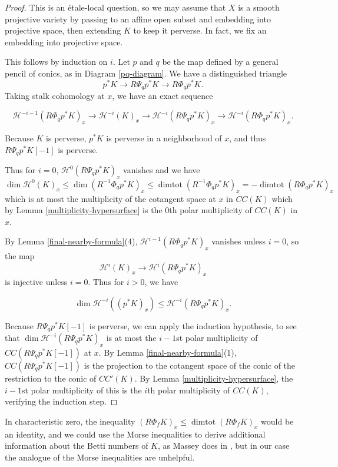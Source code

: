 \begin{proof} This is an \'{e}tale-local question, so we may assume that $X$ is a smooth projective variety by passing to an affine open subset and embedding into projective space, then extending $K$ to keep it perverse. In fact, we fix an embedding into projective space.

This follows by induction on $i$. Let $p$ and $q$ be the map defined by a general pencil of conics, as in Diagram \ref{pq-diagram}. We have a distinguished triangle \[ p^* K \to  R \Psi_q p^* K \to R \Phi_q p^*  K  .\] Taking stalk cohomology at $x$, we have an exact sequence

\[ \mathcal H^{-i-1}( R \Phi_q p^*  K)_x \to \mathcal H^{-i} ( K)_x \to \mathcal H^{-i} ( R \Psi_q p^* K)_x \to  \mathcal H^{-i}( R \Phi_q p^*  K)_x .\]


Because $K$ is perverse, $p^*K$ is perverse in a neighborhood of $x$, and thus $R \Psi_q p^* K[-1]$ is perverse.

Thus for $i=0$, $ \mathcal H^0 ( R \Psi_q p^* K)_x $ vanishes and we have
\[ \dim \mathcal H^0(K)_x \leq \dim  (R^{-1}\Phi_q p^*K)_x \leq \operatorname{dimtot} (R^{-1}  \Phi_q p^* K)_x = -  \operatorname{dimtot} (R \Phi_q p^* K)_x \] which is at most the multiplicity of the cotangent space at $x$ in $CC(K)$ which by Lemma \ref{multiplicity-hypersurface} is the $0$th polar multiplicity of $CC(K)$ in $x$.


By Lemma \ref{final-nearby-formula}(4), $\mathcal H^{i-1}( R \Phi_q p^*  K)_x$ vanishes unless $i=0$, so the map \[ \mathcal H^i ( K)_x \to \mathcal H^i ( R \Psi_q p^* K)_x \] is injective unless $i=0$. Thus for $i>0 $, we have

\[ \dim \mathcal H^{-i} ( (p^*K)_x)  \leq \mathcal H^{-i} ( R \Psi_q p^* K)_x. \]

Because $R \Psi_q p^* K [-1]$ is perverse, we can apply the induction hypothesis, to see that $\dim  \mathcal H^{-i} ( R \Psi_q p^* K)_x$  is at most the $i-1$st polar multiplicity of $CC( R \Psi_q p^* K [-1])$ at $x$. By Lemma \ref{final-nearby-formula}(1), $CC( R \Psi_q p^* K [-1])$ is the projection to the cotangent space of the conic of the restriction to the conic of $CC'(K)$. By Lemma \ref{multiplicity-hypersurface}, the $i-1$st polar multiplicity of this is the $i$th polar multiplicity of $CC(K)$, verifying the induction step.\end{proof}

In characteristic zero, the inequality $(R\Phi_f K)_x \leq \operatorname{dimtot} (R \Phi_f K)_x$ would be an identity, and we could use the Morse inequalities to derive additional information about the Betti numbers of $K$, as Massey does in \cite[Corollary 5.5]{Massey}, but in our case the analogue of the Morse inequalities are unhelpful.



